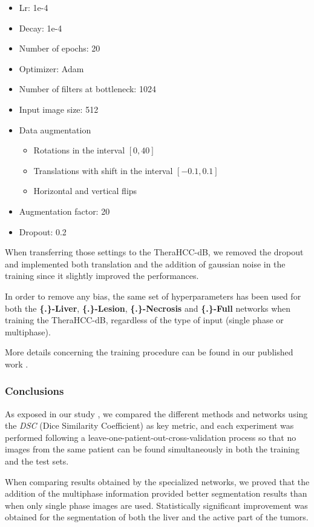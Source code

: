 \documentclass[]{article}
\newcommand{\pplfont}[1]{{\textbf{\fontfamily{ppl}\selectfont #1}}}
\begin{document}
\begin{itemize}
	\item Lr: 1e-4
	\item Decay: 1e-4
	\item Number of epochs: 20
	\item Optimizer: Adam
	\item Number of filters at bottleneck: 1024
	\item Input image size: 512
	\item Data augmentation
	\begin{itemize}
		\item Rotations in the interval $ \left[0, 40\right] $
		\item Translations with shift in the interval $ \left[-0.1, 0.1\right] $
		\item Horizontal and vertical flips
	\end{itemize}
	\item Augmentation factor: 20
	\item Dropout: 0.2
\end{itemize}

When transferring those settings to the TheraHCC-dB, we removed the
dropout and implemented both translation and the addition of gaussian
noise in the training since it slightly improved the performances.

In order to remove any bias, the same set of hyperparameters has been
used for both the \pplfont{\{.\}-Liver}, \pplfont{\{.\}-Lesion}, \pplfont{\{.\}-Necrosis} and
\pplfont{\{.\}-Full} networks when training the TheraHCC-dB, regardless of the
type of input (single phase or multiphase).

More details concerning the training procedure can be found in our
published work \cite{Ouhmich2019}.

\subsubsection*{Conclusions}

As exposed in our study \cite{Ouhmich2019}, we compared the
different methods and networks using the \emph{DSC} (Dice Similarity
Coefficient) as key metric, and each experiment was performed following
a leave-one-patient-out-cross-validation process so that no images from
the same patient can be found simultaneously in both the training and
the test sets.

When comparing results obtained by the specialized networks, we proved
that the addition of the multiphase information provided better
segmentation results than when only single phase images are used.
Statistically significant improvement was obtained for the segmentation
of both the liver and the active part of the tumors.
\end{document}
